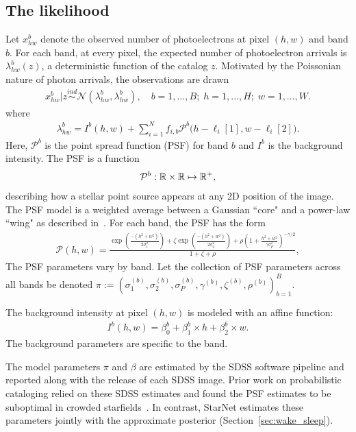 \subsection{The likelihood}
Let $x_{hw}^b$ denote the observed number of photoelectrons at pixel $(h,w)$ and band $b$. For each band, at every pixel, the expected number of photoelectron arrivals is $\lambda^b_{hw}(z)$, a deterministic function of the catalog $z$. Motivated by the Poissonian nature of photon arrivals, the observations are drawn
\begin{align}
  x_{hw}^b | z \overset{ind}{\sim} \mathcal{N}(\lambda^b_{hw}, \lambda^b_{hw}),
  \quad 
  b = 1, ..., B; \;
  h = 1,..., H; \; 
  w = 1, ..., W. 
\end{align}
where 
\begin{align}
  \lambda^b_{hw} = I^{b}(h, w) + \sum_{i = 1}^N f_{i,b} \mathcal{P}^b\big(h - \ell_{i}[1], w - \ell_{i}[2]\big).
  \label{eq:expected_intensity}
\end{align}
Here, $\mathcal{P}^b$ is the point spread function (PSF) for band $b$ and $I^{b}$ is the background intensity. The PSF is a function 
\begin{align}
\mathcal{P}^b : \mathbb{R} \times \mathbb{R} \mapsto \mathbb{R}^+,
\end{align}
describing how a stellar point source appears at any 2D position of the image. The PSF model is a weighted average between a Gaussian ``core" and a power-law ``wing" as described in~\cite{Xin2018psf}. For each band, the PSF has the form
\begin{align}
    \mathcal{P}(h, w) = \frac{\exp(\frac{-(h^2 + w^2)}{2\sigma_1^2}) + 
                            \zeta \exp(\frac{-(h^2 + w^2)}{2\sigma_2^2}) + 
                            \rho(1 + \frac{h^2 + w^2}{\gamma\sigma^2_P})^{-\gamma/2} }{1 + \zeta + \rho},
\end{align}
The PSF parameters vary by band. Let the collection of PSF parameters across all bands be denoted $\pi := (\sigma_{1}^{(b)}, \sigma_{2}^{(b)}, \sigma_{P}^{(b)}, \gamma^{(b)}, \zeta^{(b)}, \rho^{(b)})_{b=1}^B$.

The background intensity at pixel $(h,w)$ is modeled with an affine function: 
\begin{align}
    I^{b}(h,w) = \beta_0^{b} + \beta_1^{b} \times h + \beta_2^{b} \times w.
\end{align}
The background parameters are specific to the band. 

The model parameters $\pi$ and $\beta$ are estimated by the SDSS software pipeline and reported along with the release of each SDSS image.
Prior work on probabilistic cataloging relied 
on these SDSS estimates and found the PSF estimates to be suboptimal in crowded starfields~\cite{Feder_2019}. 
In contrast, StarNet estimates these parameters jointly with the approximate posterior (Section~\ref{sec:wake_sleep}). 

